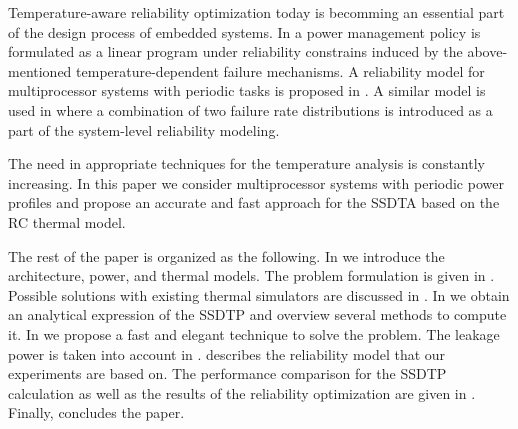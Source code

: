 Temperature-aware reliability optimization today is becomming an essential part of the design process of embedded systems.  In \cite{coskun2006} a power management policy is formulated as a linear program under reliability constrains induced by the above-mentioned temperature-dependent failure mechanisms. A reliability model for multiprocessor systems with periodic tasks is proposed in \cite{huang2009}. A similar model is used in \cite{xiang2010} where a combination of two failure rate distributions is introduced as a part of the system-level reliability modeling.

The need in appropriate techniques for the temperature analysis is constantly increasing. In this paper we consider multiprocessor systems with periodic power profiles and propose an accurate and fast approach for the SSDTA based on the RC thermal model.

The rest of the paper is organized as the following. In  we introduce the architecture, power, and thermal models. The problem formulation is given in . Possible solutions with existing thermal simulators are discussed in . In  we obtain an analytical expression of the SSDTP and overview several methods to compute it. In  we propose a fast and elegant technique to solve the problem. The leakage power is taken into account in .  describes the reliability model that our experiments are based on. The performance comparison for the SSDTP calculation as well as the results of the reliability optimization are given in . Finally,  concludes the paper.
